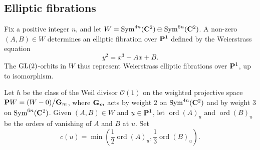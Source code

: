\documentclass{amsart}
\renewcommand{\O}{\mathcal O}
\begin{document}
\subsection{Elliptic fibrations}\label{sec:introellipticfibrations}
Fix a positive integer \(n\), and let \(W = \Sym^{4n}(\C^2) \oplus \Sym^{6n}(\C^2)\).
A non-zero \((A, B) \in W\) determines an elliptic fibration over \(\P^{1}\) defined by the Weierstrass equation
\[ y^2 = x^3 + Ax + B.\]
The \(\GL(2)\)-orbits in \(W\) thus represent Weierstrass elliptic fibrations over \(\P^1\), up to isomorphism.

Let \(h\) be the class of the Weil divisor \(\O(1)\) on the weighted projective space \(\P W = (W - 0) \big / \Gm\), where \(\Gm\) acts by weight \(2\) on \(\Sym^{4n}(\C^2)\) and by weight \(3\) on \(\Sym^{6n}(\C^2)\).
Given \((A, B) \in W\) and \(u \in \P^{1}\), let \(\operatorname{ord}(A)_u\) and \(\operatorname{ord}(B)_u\) be the orders of vanishing of \(A\) and \(B\) at \(u\).
Set
\[c(u) = \min\left(\frac{1}{2}\operatorname{ord}(A)_u, \frac{1}{3}\operatorname{ord}(B)_u\right).\]
\end{document}
